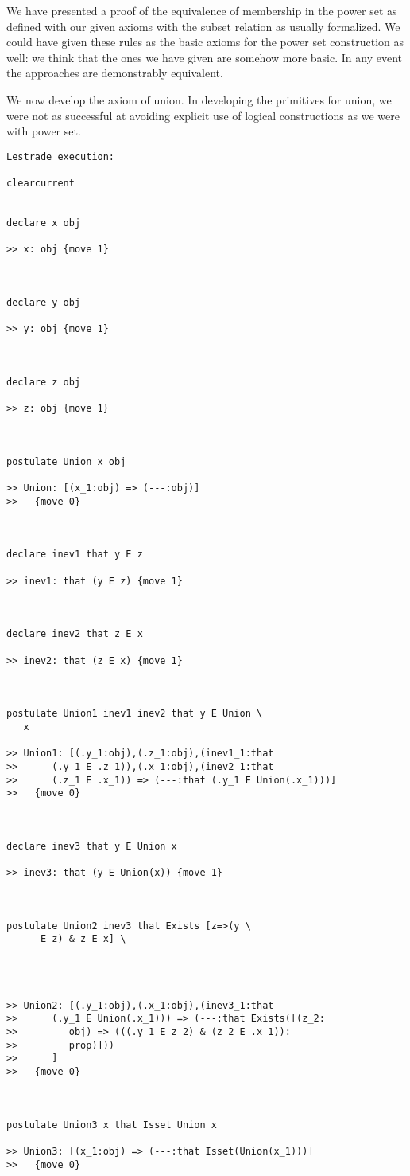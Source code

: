\documentclass{article}
\begin{document}
We have presented a proof of the equivalence of membership in the power set as defined with our given axioms with the subset relation as usually formalized.  We could have
given these rules as the basic axioms for the power set construction as well:  we think that the ones we have given are somehow more basic.  In any event the approaches are demonstrably equivalent.

We now develop the axiom of union.  In developing the primitives for union, we were not as successful at avoiding explicit use of logical constructions as we were with power set.

\begin{verbatim}Lestrade execution:

clearcurrent


declare x obj

>> x: obj {move 1}



declare y obj

>> y: obj {move 1}



declare z obj

>> z: obj {move 1}



postulate Union x obj

>> Union: [(x_1:obj) => (---:obj)]
>>   {move 0}



declare inev1 that y E z

>> inev1: that (y E z) {move 1}



declare inev2 that z E x

>> inev2: that (z E x) {move 1}



postulate Union1 inev1 inev2 that y E Union \
   x

>> Union1: [(.y_1:obj),(.z_1:obj),(inev1_1:that
>>      (.y_1 E .z_1)),(.x_1:obj),(inev2_1:that
>>      (.z_1 E .x_1)) => (---:that (.y_1 E Union(.x_1)))]
>>   {move 0}



declare inev3 that y E Union x

>> inev3: that (y E Union(x)) {move 1}



postulate Union2 inev3 that Exists [z=>(y \
      E z) & z E x] \
   



>> Union2: [(.y_1:obj),(.x_1:obj),(inev3_1:that
>>      (.y_1 E Union(.x_1))) => (---:that Exists([(z_2:
>>         obj) => (((.y_1 E z_2) & (z_2 E .x_1)):
>>         prop)]))
>>      ]
>>   {move 0}



postulate Union3 x that Isset Union x

>> Union3: [(x_1:obj) => (---:that Isset(Union(x_1)))]
>>   {move 0}


\end{verbatim}
\end{document}
